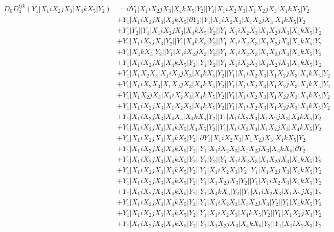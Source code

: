 \documentclass{article}[12pt]
\begin{document}
\begin{align*}
D_0 D_3^{ijk}(Y_1|X_1iX_2jX_3|X_4kX_5|Y_2)& =\partial Y_1|X_1iX_2jX_3|X_4kX_5|Y_2||Y_1|X_1iX_2X_3|X_1X_2jX_3|X_4kX_5|Y_2\\ 
 & +Y_1|X_1iX_2jX_3|X_4kX_5|\partial Y_2||Y_1|X_1iX_2X_3|X_1X_2jX_3|X_4kX_5|Y_2\\ 
 & +Y_1|Y_2||Y_1|X_1iX_2jX_3|X_4kX_5|Y_2||Y_1|X_1iX_2X_3|X_1X_2jX_3|X_4kX_5|Y_2\\ 
 & +Y_1|X_1iX_2jX_3|Y_2||Y_1|X_4kX_5|Y_2||Y_1|X_1iX_2X_3|X_1X_2jX_3|X_4kX_5|Y_2\\ 
 & +Y_1|X_4kX_5|Y_2||Y_1|X_1iX_2jX_3|Y_2||Y_1|X_1iX_2X_3|X_1X_2jX_3|X_4kX_5|Y_2\\ 
 & +Y_1|X_1iX_2jX_3|X_4kX_5|Y_2||Y_1|Y_2||Y_1|X_1iX_2X_3|X_1X_2jX_3|X_4kX_5|Y_2\\ 
 & +Y_1|X_1X_2X_3|X_1iX_2jX_3|X_4kX_5|Y_2||Y_1|X_1iX_2X_3|X_1X_2jX_3|X_4kX_5|Y_2\\ 
 & +Y_1|X_1iX_2X_3|X_1X_2jX_3|X_4kX_5|Y_2||Y_1|X_1iX_2X_3|X_1X_2jX_3|X_4kX_5|Y_2\\ 
 & +Y_1|X_1X_2jX_3|X_1iX_2X_3|X_4kX_5|Y_2||Y_1|X_1iX_2X_3|X_1X_2jX_3|X_4kX_5|Y_2\\ 
 & +Y_1|X_1iX_2jX_3|X_1X_2X_3|X_4kX_5|Y_2||Y_1|X_1iX_2X_3|X_1X_2jX_3|X_4kX_5|Y_2\\ 
 & +Y_1|X_1iX_2jX_3|X_4X_5|X_4kX_5|Y_2||Y_1|X_1iX_2X_3|X_1X_2jX_3|X_4kX_5|Y_2\\ 
 & +Y_1|X_1iX_2jX_3|X_4kX_5|X_4X_5|Y_2||Y_1|X_1iX_2X_3|X_1X_2jX_3|X_4kX_5|Y_2\\ 
 & +Y_1|X_1iX_2jX_3|X_4kX_5|Y_2||\partial Y_1|X_1iX_2X_3|X_1X_2jX_3|X_4kX_5|Y_2\\ 
 & +Y_1|X_1iX_2jX_3|X_4kX_5|Y_2||Y_1|X_1iX_2X_3|X_1X_2jX_3|X_4kX_5|\partial Y_2\\ 
 & +Y_1|X_1iX_2jX_3|X_4kX_5|Y_2||Y_1|Y_2||Y_1|X_1iX_2X_3|X_1X_2jX_3|X_4kX_5|Y_2\\ 
 & +Y_1|X_1iX_2jX_3|X_4kX_5|Y_2||Y_1|X_1iX_2X_3|Y_2||Y_1|X_1X_2jX_3|X_4kX_5|Y_2\\ 
 & +Y_1|X_1iX_2jX_3|X_4kX_5|Y_2||Y_1|X_1X_2jX_3|Y_2||Y_1|X_1iX_2X_3|X_4kX_5|Y_2\\ 
 & +Y_1|X_1iX_2jX_3|X_4kX_5|Y_2||Y_1|X_4kX_5|Y_2||Y_1|X_1iX_2X_3|X_1X_2jX_3|Y_2\\ 
 & +Y_1|X_1iX_2jX_3|X_4kX_5|Y_2||Y_1|X_1iX_2X_3|X_1X_2jX_3|Y_2||Y_1|X_4kX_5|Y_2\\ 
 & +Y_1|X_1iX_2jX_3|X_4kX_5|Y_2||Y_1|X_1iX_2X_3|X_4kX_5|Y_2||Y_1|X_1X_2jX_3|Y_2\\ 
 & +Y_1|X_1iX_2jX_3|X_4kX_5|Y_2||Y_1|X_1X_2jX_3|X_4kX_5|Y_2||Y_1|X_1iX_2X_3|Y_2\\ 

\end{align*}
\end{document}
